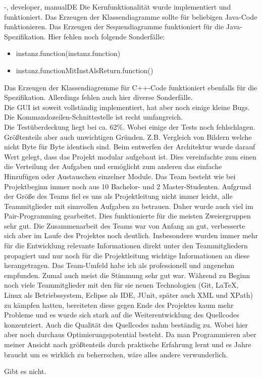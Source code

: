 \documentclass[twoside]{report}
\begin{document}
\begin{shownto}{-, developer, manualDE}
Die Kernfunktionalität wurde implementiert und funktioniert. Das Erzeugen der Klassendiagramme sollte für beliebigen Java-Code funktionieren. Das Erzeugen der Sequendiagramme funktioniert für die Java-Spezifikation. Hier fehlen noch folgende Sonderfälle:
\begin{itemize}
\item instanz.function(instanz.function)
\item instanz.functionMitInstAlsReturn.function()
\end{itemize}
Das Erzeugen der Klassendiagremme für C++-Code funktioniert ebenfalls für die Spezifikation. Allerdings fehlen auch hier diverse Sonderfälle.\\
Die GUI ist soweit vollständig implementiert, hat aber noch einige kleine Bugs. \\
Die Kommandozeilen-Schnittestelle ist recht umfangreich.\\
\nsecend
{}
Die Testüberdeckung liegt bei ca. 62\%. Wobei einige der Tests noch fehlschlagen. Größtenteils aber auch unwichtigen Gründen. Z.B. Vergleich von Bildern welche nicht Byte für Byte identisch sind.
\nsecend
{}
Beim entwerfen der Architektur wurde darauf Wert gelegt, dass das Projekt modular aufgebaut ist. Dies vereinfachte zum einen die Verteilung der Aufgaben und ermöglicht zum anderen das einfache Hinzufügen oder Austauschen einzelner Module.
\nsecend
{}
Das Team besteht wie bei Projektbeginn immer noch aus 10 Bachelor- und 2 Master-Studenten. Aufgrund der Größe des Teams fiel es uns als Projektleitung nicht immer leicht, alle Teammitglieder mit sinnvollen Aufgaben zu betrauen. Daher wurde auch viel im Pair-Programming gearbeitet. Dies funktionierte für die meisten Zweiergruppen sehr gut. Die Zusammenarbeit des Teams war von Anfang an gut, verbesserte sich aber im Laufe des Projektes noch deutlich. Insbesondere wurden immer mehr für die Entwicklung relevante Informationen direkt unter den Teammitgliedern propagiert und nur noch für die Projektleitung wichtige Informationen an diese herangetragen. Das Team-Umfeld habe ich als professionell und angenehm empfunden. Zumal auch meist die Stimmung sehr gut war. 
\nsecend
{}
Während zu Beginn noch viele Teammitglieder mit den für sie neuen Technologien (Git, LaTeX, Linux als Betriebssystem, Eclipse als IDE, JUnit, später auch XML und XPath) zu kämpfen hatten, bereiteten diese gegen Ende des Projektes kaum mehr Probleme und es wurde sich stark auf die Weiterentwicklung des Quellcodes konzentriert. Auch die Qualität des Quellcodes nahm beständig zu. Wobei hier aber noch durchaus Optimierungspotential besteht. Da man Programmieren aber meiner Ansicht nach größtenteils durch praktische Erfahrung lernt und es Jahre braucht um es wirklich zu beherrschen, wäre alles andere verwunderlich.
\nsecend
\nsecend %

Gibt es nicht.
\nsecend


\nsecend %

\nsecdocumentend

\end{shownto} %
\end{document}
